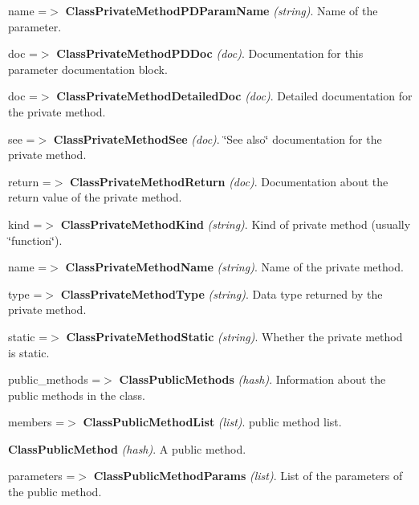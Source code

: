\begin{DoxyItemize}
\begin{DoxyItemize}
\begin{DoxyItemize}
\begin{DoxyItemize}
\begin{DoxyItemize}
\begin{DoxyItemize}
\begin{DoxyItemize}
\begin{DoxyItemize}
\begin{DoxyItemize}
\begin{DoxyItemize}
\begin{DoxyItemize}
\begin{DoxyItemize}
\item name =$>$ {\bfseries ClassPrivateMethodPDParamName} {\itshape (string)\/}. Name of the parameter. 
\end{DoxyItemize}
\end{DoxyItemize}
\item doc =$>$ {\bfseries ClassPrivateMethodPDDoc} {\itshape (doc)\/}. Documentation for this parameter documentation block. 
\end{DoxyItemize}
\end{DoxyItemize}
\item doc =$>$ {\bfseries ClassPrivateMethodDetailedDoc} {\itshape (doc)\/}. Detailed documentation for the private method. 
\item see =$>$ {\bfseries ClassPrivateMethodSee} {\itshape (doc)\/}. \char`\"{}See also\char`\"{} documentation for the private method. 
\item return =$>$ {\bfseries ClassPrivateMethodReturn} {\itshape (doc)\/}. Documentation about the return value of the private method. 
\end{DoxyItemize}
\item kind =$>$ {\bfseries ClassPrivateMethodKind} {\itshape (string)\/}. Kind of private method (usually \char`\"{}function\char`\"{}). 
\item name =$>$ {\bfseries ClassPrivateMethodName} {\itshape (string)\/}. Name of the private method. 
\item type =$>$ {\bfseries ClassPrivateMethodType} {\itshape (string)\/}. Data type returned by the private method. 
\item static =$>$ {\bfseries ClassPrivateMethodStatic} {\itshape (string)\/}. Whether the private method is static. 
\end{DoxyItemize}
\end{DoxyItemize}
\end{DoxyItemize}
\item public\_\-methods =$>$ {\bfseries ClassPublicMethods} {\itshape (hash)\/}. Information about the public methods in the class. 
\begin{DoxyItemize}
\item members =$>$ {\bfseries ClassPublicMethodList} {\itshape (list)\/}. public method list. 
\begin{DoxyItemize}
\item {\bfseries ClassPublicMethod} {\itshape (hash)\/}. A public method. 
\begin{DoxyItemize}
\item parameters =$>$ {\bfseries ClassPublicMethodParams} {\itshape (list)\/}. List of the parameters of the public method. 

\end{DoxyItemize}
\end{DoxyItemize}
\end{DoxyItemize}
\end{DoxyItemize}
\end{DoxyItemize}
\end{DoxyItemize}
\end{DoxyItemize}
